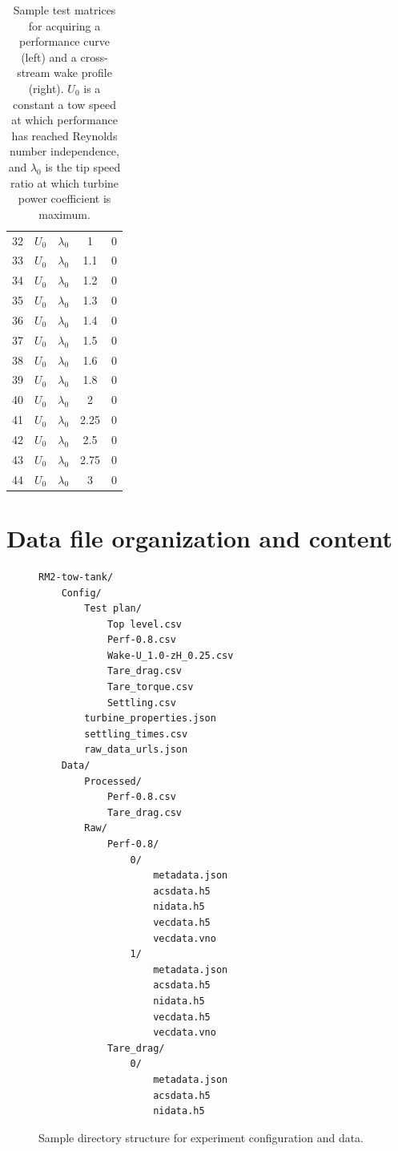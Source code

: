 \documentclass[12pt,letterpaper]{scrreprt}
\begin{document}
\begin{appendices}
\begin{table}[!ht]
{\begin{tabular}{c|c|c|c|c}
32  & $U_0$        & $\lambda_0$ & 1     & 0   \\
33  & $U_0$        & $\lambda_0$ & 1.1   & 0   \\
34  & $U_0$        & $\lambda_0$ & 1.2   & 0   \\
35  & $U_0$        & $\lambda_0$ & 1.3   & 0   \\
36  & $U_0$        & $\lambda_0$ & 1.4   & 0   \\
37  & $U_0$        & $\lambda_0$ & 1.5   & 0   \\
38  & $U_0$        & $\lambda_0$ & 1.6   & 0   \\
39  & $U_0$        & $\lambda_0$ & 1.8   & 0   \\
40  & $U_0$        & $\lambda_0$ & 2     & 0   \\
41  & $U_0$        & $\lambda_0$ & 2.25  & 0   \\
42  & $U_0$        & $\lambda_0$ & 2.5   & 0   \\
43  & $U_0$        & $\lambda_0$ & 2.75  & 0   \\
44  & $U_0$        & $\lambda_0$ & 3     & 0  
\end{tabular}}
\caption{Sample test matrices for acquiring a performance curve (left) and a
cross-stream wake profile (right). $U_0$ is a constant a tow speed at which
performance has reached Reynolds number independence, and $\lambda_0$ is the tip
speed ratio at which turbine power coefficient is maximum.}
\label{tab-test_section}
\end{table}


\chapter{Data file organization and content}

\begin{figure}
\begin{verbatim}
RM2-tow-tank/
    Config/
        Test plan/
            Top level.csv
            Perf-0.8.csv
            Wake-U_1.0-zH_0.25.csv
            Tare_drag.csv
            Tare_torque.csv
            Settling.csv
        turbine_properties.json
        settling_times.csv
        raw_data_urls.json
    Data/
        Processed/
            Perf-0.8.csv
            Tare_drag.csv
        Raw/
            Perf-0.8/
                0/
                    metadata.json
                    acsdata.h5
                    nidata.h5
                    vecdata.h5
                    vecdata.vno
                1/    
                    metadata.json
                    acsdata.h5
                    nidata.h5
                    vecdata.h5
                    vecdata.vno
            Tare_drag/
                0/
                    metadata.json
                    acsdata.h5
                    nidata.h5
\end{verbatim}
\caption{Sample directory structure for experiment configuration and data.}
\label{fig-dir_structure}
\end{figure}


\end{appendices}
\end{document}
